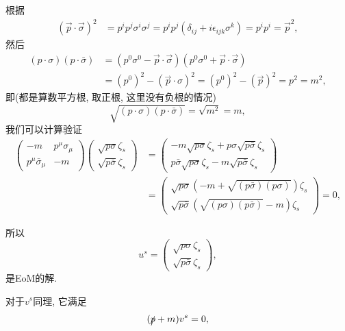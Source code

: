 根据
\begin{align}
    (\vec p\cdot\vec\sigma)^2&=p^ip^j\sigma^i\sigma^j=p^ip^j(\delta_{ij}+i\epsilon_{ijk}\sigma^k)=p^ip^i=\vec p^2,
\end{align}
然后
\begin{align}
    (p\cdot\sigma)(p\cdot\bar\sigma)&=(p^0\sigma^0-\vec p\cdot\vec\sigma)(p^0\sigma^0+\vec p\cdot\vec\sigma)\\
    &=(p^0)^2-(\vec p\cdot\sigma)^2=(p^0)^2-(\vec p)^2=p^2=m^2,
\end{align}
即(都是算数平方根, 取正根, 这里没有负根的情况)
\begin{equation}
    \sqrt{(p\cdot\sigma)(p\cdot\bar\sigma)}=\sqrt{m^2}=m,
\end{equation}
我们可以计算验证
\begin{align}
    \begin{pmatrix}
        -m & p^\mu\sigma_\mu\\
        p^\mu\bar\sigma_\mu & -m
    \end{pmatrix}\begin{pmatrix}
        \sqrt{p\sigma}\zeta_s\\
        \sqrt{p\bar\sigma}\zeta_s
    \end{pmatrix}&=\begin{pmatrix}
        -m\sqrt{p\sigma}\zeta_s+p\sigma\sqrt{p\bar\sigma}\zeta_s\\
        p\bar\sigma\sqrt{p\sigma}\zeta_s-m\sqrt{p\bar\sigma}\zeta_s
    \end{pmatrix}\\
    &=\begin{pmatrix}
        \sqrt{p\sigma}\left(-m+\sqrt{(p\bar\sigma)(p\sigma)}\right)\zeta_s\\
        \sqrt{p\bar\sigma}\left(\sqrt{(p\sigma)(p\bar\sigma)}-m\right)\zeta_s
    \end{pmatrix}=0,
\end{align}

所以
\begin{equation}
    u^s=\begin{pmatrix}
        \sqrt{p\sigma}\zeta_s\\
        \sqrt{p\bar\sigma}\zeta_s
    \end{pmatrix},
\end{equation}
是EoM的解.

对于$v^s$同理, 它满足
\begin{equation}
    (\slashed p+m)v^s=0,
\end{equation}

